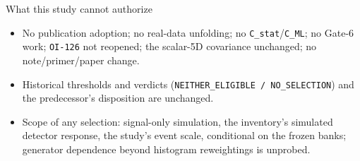 \documentclass[aspectratio=169,10pt]{beamer}
\def\evidencetext{}
\begin{document}
\gdef\evidencetext{\texttt{docs/orchestration/AUTHORIZATION-20260925-pet-final-design.md}}
\begin{frame}{What this study cannot authorize}
\small\begin{itemize}
\item No publication adoption; no real-data unfolding; no \texttt{C\_stat}/\texttt{C\_ML}; no Gate-6 work;
  \texttt{OI-126} not reopened; the scalar-5D covariance unchanged; no note/primer/paper change.
\item Historical thresholds and verdicts (\texttt{NEITHER\_ELIGIBLE / NO\_SELECTION}) and the predecessor's
  disposition are unchanged.
\item Scope of any selection: signal-only simulation, the inventory's simulated detector response, the study's
  event scale, conditional on the frozen banks; generator dependence beyond histogram reweightings is unprobed.
\end{itemize}
\end{frame}
\end{document}
